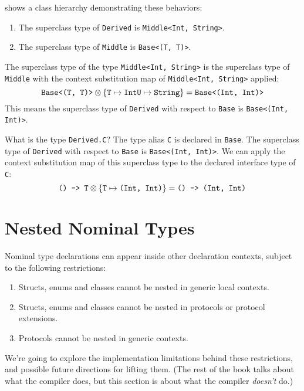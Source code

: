 \documentclass[../generics]{subfiles}
\begin{document}
\begin{example}\label{genericsuperclassexample}
 shows a class hierarchy demonstrating these behaviors:
\begin{enumerate}
\item The superclass type of \texttt{Derived} is \texttt{Middle<Int, String>}.
\item The superclass type of \texttt{Middle} is \texttt{Base<(T, T)>}.
\end{enumerate}
The superclass type of the type \texttt{Middle<Int, String>} is the superclass type of \texttt{Middle} with the context substitution map of \texttt{Middle<Int, String>} applied:
\[\texttt{Base<(T, T)>}\otimes
\{
\texttt{T} \mapsto \texttt{Int}\\
\texttt{U} \mapsto \texttt{String}
\} = \texttt{Base<(Int, Int)>}
\]
This means the superclass type of \texttt{Derived} with respect to \texttt{Base} is \texttt{Base<(Int, Int)>}.

What is the type \texttt{Derived.C}? The type alias \texttt{C} is declared in \texttt{Base}. The superclass type of \texttt{Derived} with respect to \texttt{Base} is \texttt{Base<(Int, Int)>}. We can apply the context substitution map of this superclass type to the declared interface type of \texttt{C}:
\[\texttt{() -> T}\otimes
\{
\texttt{T} \mapsto \texttt{(Int, Int)}
\} = \texttt{() -> (Int, Int)}
\]
\end{example}

\fi

\section{Nested Nominal Types}\label{nested nominal types}

Nominal type declarations can appear inside other declaration contexts, subject to the following restrictions:
\begin{enumerate}
\item Structs, enums and classes cannot be nested in generic local contexts.
\item Structs, enums and classes cannot be nested in protocols or protocol extensions.
\item Protocols cannot be nested in generic contexts.
\end{enumerate}
We're going to explore the implementation limitations behind these restrictions, and possible future directions for lifting them. (The rest of the book talks about what the compiler does, but this section is about what the compiler \emph{doesn't} do.)
\end{document}
